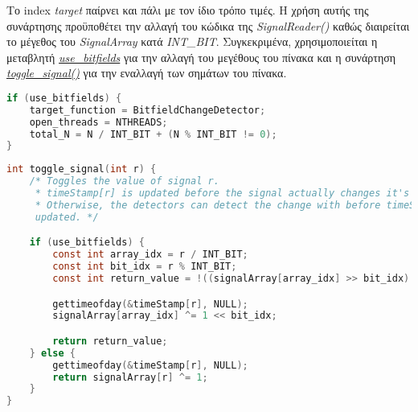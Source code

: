 Το index \textit{target} παίρνει και πάλι με τον ίδιο τρόπο τιμές.
Η χρήση αυτής της συνάρτησης προϋποθέτει την αλλαγή του κώδικα της 
\textit{SignalReader()} 
καθώς διαιρείται το μέγεθος του \textit{SignalArray} κατά \textit{INT\_BIT}. 
Συγκεκριμένα, χρησιμοποιείται η μεταβλητή 
\hyperref[lst:total_N]{\textit{use\_bitfields}} για την αλλαγή του μεγέθους του 
πίνακα και η συνάρτηση \hyperref[lst:togle_signal]{\textit{toggle\_signal()}} 
για την 
εναλλαγή των σημάτων του πίνακα.
\begin{lstlisting}[language=c, caption={Αλλαγή μεγέθους του SignalArray}, 
escapechar=$, label={lst:total_N}]
if (use_bitfields) {
    target_function = BitfieldChangeDetector;
    open_threads = NTHREADS;
    total_N = N / INT_BIT + (N % INT_BIT != 0);
}
\end{lstlisting}
\begin{lstlisting}[language=c, caption={toggle\_signal()}, 
escapechar=$, label={lst:togle_signal}]
int toggle_signal(int r) {
    /* Toggles the value of signal r.
     * timeStamp[r] is updated before the signal actually changes it's value.
     * Otherwise, the detectors can detect the change with before timeStamp is 
     updated. */

    if (use_bitfields) {
        const int array_idx = r / INT_BIT;
        const int bit_idx = r % INT_BIT;
        const int return_value = !((signalArray[array_idx] >> bit_idx) & 1);

        gettimeofday(&timeStamp[r], NULL);
        signalArray[array_idx] ^= 1 << bit_idx;

        return return_value;
    } else {
        gettimeofday(&timeStamp[r], NULL);
        return signalArray[r] ^= 1;
    }
}
\end{lstlisting}